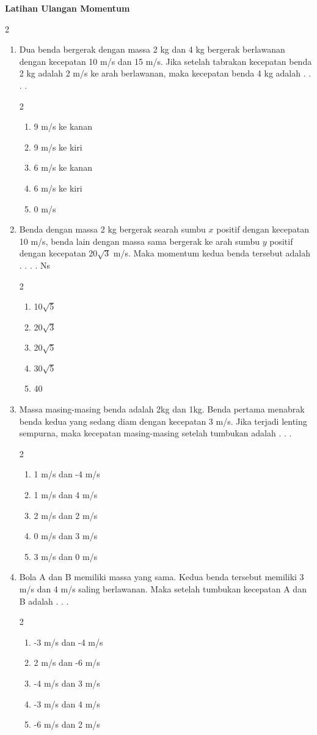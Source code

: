 \documentclass[10pt,a4paper]{extarticle}
\newcommand{\pilgani}[1]{                            \vspace{-0.3cm}\begin{multicols}{2}
 \begin{enumerate}[label=\Alph*., itemsep=0pt,topsep=0pt,leftmargin=*,align=Center]#1                     \end{enumerate}
 \phantom{ini cuma sapi, wedus, dan ayam}
 \end{multicols}}
\begin{document}
 \textbf{Latihan Ulangan Momentum} \phantom{ini nama siswa yang aaamengerjakan soal kuis ini }  

\begin{multicols*}{2}

\begin{enumerate}
\item Dua benda bergerak dengan massa 2 kg dan 4 kg bergerak berlawanan dengan kecepatan 10 m/s dan 15 m/s. Jika setelah tabrakan kecepatan benda 2 kg adalah 2 m/s ke arah berlawanan, maka kecepatan benda 4 kg adalah . . . . 
\pilgani{
   \item 9 m/s ke kanan
   \item 9 m/s ke kiri
   \item 6 m/s ke kanan
   \item 6 m/s ke kiri
   \item 0 m/s
}
\vspace{2cm}

\item Benda dengan massa 2 kg bergerak searah sumbu $x$ positif dengan kecepatan 10 m/s, benda lain dengan massa sama bergerak ke arah sumbu $y$ positif dengan kecepatan 20$\sqrt{3}$ m/s. Maka momentum kedua benda tersebut adalah . .  . .  Ns
\pilgani{
   \item 10$\sqrt{5}$
   \item 20$\sqrt{3}$
   \item 20$\sqrt{5}$
   \item 30$\sqrt{5}$
   \item 40}
\vspace{2cm}


\item Massa masing-masing benda adalah 2kg dan 1kg. Benda pertama menabrak benda kedua yang sedang diam dengan kecepatan 3 m/s. Jika terjadi lenting sempurna, maka kecepatan masing-masing setelah tumbukan adalah . . . 
\pilgani{
   \item 1 m/s dan -4 m/s
   \item 1 m/s dan 4 m/s
   \item 2 m/s dan 2 m/s
   \item 0 m/s dan 3 m/s
   \item 3 m/s dan 0 m/s}
   \vspace{2.5cm}

\item Bola A dan B memiliki massa yang sama. Kedua benda tersebut memiliki 3 m/s dan 4 m/s saling berlawanan. Maka setelah tumbukan kecepatan A dan B adalah . . .
\pilgani{
   \item -3 m/s dan -4 m/s
   \item 2 m/s dan -6 m/s
   \item -4 m/s dan 3 m/s
   \item -3 m/s dan 4 m/s
   \item -6 m/s dan 2 m/s
}
\vspace{2cm}




\end{enumerate}
\end{multicols*}
\end{document}
